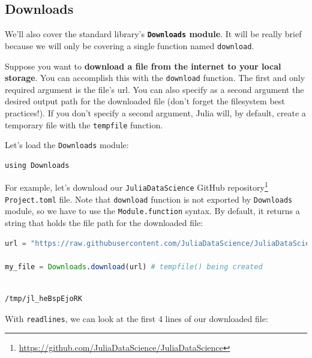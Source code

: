 \documentclass[
  notoc %
]{tufte-book}
\DeclareRobustCommand{\href}[2]{#2\footnote{\url{#1}}}
\newcommand{\passthrough}[1]{#1}
\begin{document}
\hypertarget{sec:downloads}{%
\subsection{Downloads}\label{sec:downloads}}

We'll also cover the standard library's
\textbf{\passthrough{\lstinline!Downloads!} module}. It will be really
brief because we will only be covering a single function named
\passthrough{\lstinline!download!}.

Suppose you want to \textbf{download a file from the internet to your
local storage}. You can accomplish this with the
\passthrough{\lstinline!download!} function. The first and only required
argument is the file's url. You can also specify as a second argument
the desired output path for the downloaded file (don't forget the
filesystem best practices!). If you don't specify a second argument,
Julia will, by default, create a temporary file with the
\passthrough{\lstinline!tempfile!} function.

Let's load the \passthrough{\lstinline!Downloads!} module:

\begin{lstlisting}
using Downloads
\end{lstlisting}

For example, let's download our
\href{https://github.com/JuliaDataScience/JuliaDataScience}{\passthrough{\lstinline!JuliaDataScience!}
GitHub repository} \passthrough{\lstinline!Project.toml!} file. Note
that \passthrough{\lstinline!download!} function is not exported by
\passthrough{\lstinline!Downloads!} module, so we have to use the
\passthrough{\lstinline!Module.function!} syntax. By default, it returns
a string that holds the file path for the downloaded file:

\begin{lstlisting}[language=Julia]
url = "https://raw.githubusercontent.com/JuliaDataScience/JuliaDataScience/main/Project.toml"

my_file = Downloads.download(url) # tempfile() being created
\end{lstlisting}

\begin{lstlisting}[language=Output]

/tmp/jl_heBspEjoRK

\end{lstlisting}

With \passthrough{\lstinline!readlines!}, we can look at the first 4
lines of our downloaded file:
\end{document}
